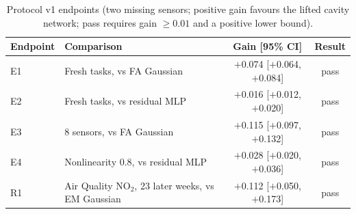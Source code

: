 \begin{table}[t]
\centering\small
\caption{\label{tab:v1}Protocol v1 endpoints (two missing sensors; positive gain favours the lifted cavity network; pass requires gain $\geq0.01$ and a positive lower bound).}
\begin{tabular}{llcc}
\toprule
Endpoint & Comparison & Gain [95\% CI] & Result\\
\midrule
E1 & Fresh tasks, vs FA Gaussian & $+$0.074 [$+$0.064, $+$0.084] & pass\\
E2 & Fresh tasks, vs residual MLP & $+$0.016 [$+$0.012, $+$0.020] & pass\\
E3 & 8 sensors, vs FA Gaussian & $+$0.115 [$+$0.097, $+$0.132] & pass\\
E4 & Nonlinearity 0.8, vs residual MLP & $+$0.028 [$+$0.020, $+$0.036] & pass\\
R1 & Air Quality NO$_2$, 23 later weeks, vs EM Gaussian & $+$0.112 [$+$0.050, $+$0.173] & pass\\
\bottomrule
\end{tabular}
\end{table}
